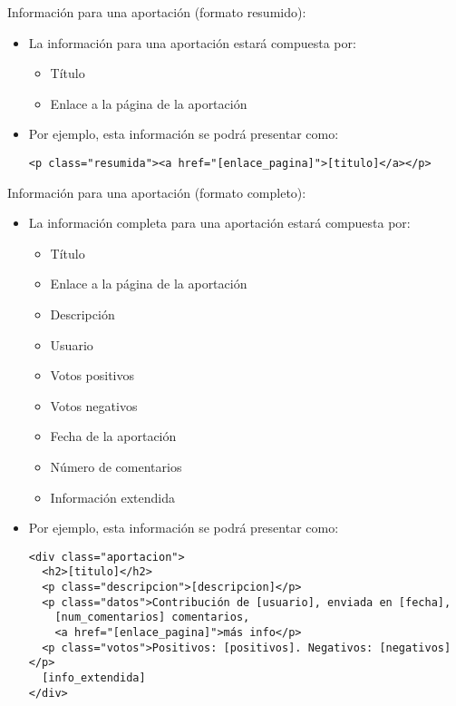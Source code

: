 Información para una aportación (formato resumido):

\begin{itemize}
\item La información para una aportación estará compuesta por:
  \begin{itemize}
  \item Título
  \item Enlace a la página de la aportación    
  \end{itemize}

\item Por ejemplo, esta información se podrá presentar como:

{\footnotesize
\begin{verbatim}
<p class="resumida"><a href="[enlace_pagina]">[titulo]</a></p>
\end{verbatim}
}

\end{itemize}

Información para una aportación (formato completo):

\begin{itemize}
\item La información completa para una aportación estará compuesta por:
  \begin{itemize}
  \item Título
  \item Enlace a la página de la aportación
  \item Descripción
  \item Usuario
  \item Votos positivos
  \item Votos negativos
  \item Fecha de la aportación
  \item Número de comentarios
  \item Información extendida
  \end{itemize}

\item Por ejemplo, esta información se podrá presentar como:

{\footnotesize
\begin{verbatim}
<div class="aportacion">
  <h2>[titulo]</h2>
  <p class="descripcion">[descripcion]</p>
  <p class="datos">Contribución de [usuario], enviada en [fecha],
    [num_comentarios] comentarios,
    <a href="[enlace_pagina]">más info</p>
  <p class="votos">Positivos: [positivos]. Negativos: [negativos]</p>
  [info_extendida]
</div>
\end{verbatim}
}

\end{itemize}

